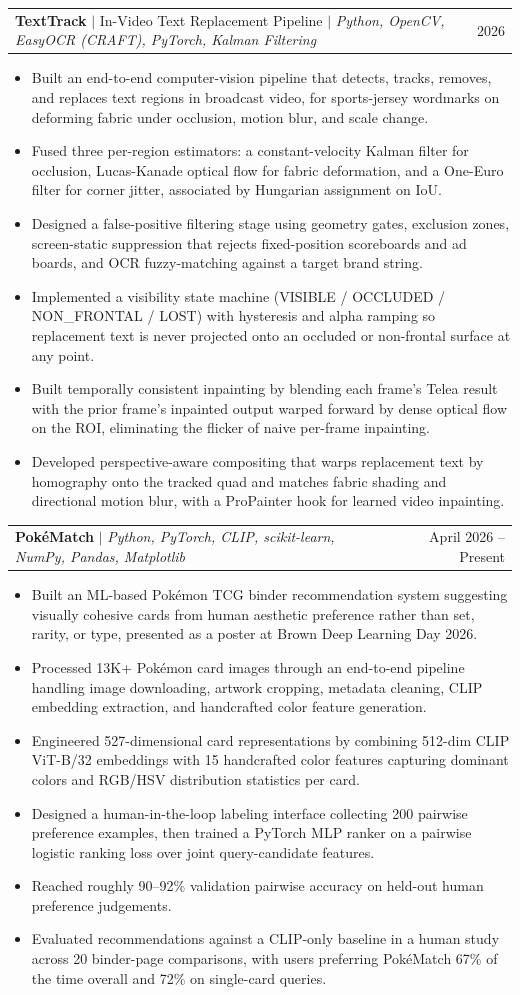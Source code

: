 \documentclass[letterpaper,11pt]{article}
\makeatletter
\newcommand{\resumeItem}[1]{
  \item\small{
    {#1 \vspace{-2pt}}
  }
}
\newcommand{\resumeProjectHeading}[2]{
    \item
    \begin{tabular*}{0.97\textwidth}{l@{\extracolsep{\fill}}r}
      \small#1 & #2 \\
    \end{tabular*}\vspace{-7pt}
}
\newcommand{\resumeItemListStart}{\begin{itemize}}
\newcommand{\resumeItemListEnd}{\end{itemize}\vspace{-5pt}}
\makeatother
\begin{document}
      \resumeProjectHeading
          {\textbf{TextTrack} $|$ In-Video Text Replacement Pipeline $|$ \emph{Python, OpenCV, EasyOCR (CRAFT), PyTorch, Kalman Filtering}}{2026}
          \resumeItemListStart
            \resumeItem{Built an end-to-end computer-vision pipeline that detects, tracks, removes, and replaces text regions in broadcast video, for sports-jersey wordmarks on deforming fabric under occlusion, motion blur, and scale change.}
            \resumeItem{Fused three per-region estimators: a constant-velocity Kalman filter for occlusion, Lucas-Kanade optical flow for fabric deformation, and a One-Euro filter for corner jitter, associated by Hungarian assignment on IoU.}
            \resumeItem{Designed a false-positive filtering stage using geometry gates, exclusion zones, screen-static suppression that rejects fixed-position scoreboards and ad boards, and OCR fuzzy-matching against a target brand string.}
            \resumeItem{Implemented a visibility state machine (VISIBLE / OCCLUDED / NON\_FRONTAL / LOST) with hysteresis and alpha ramping so replacement text is never projected onto an occluded or non-frontal surface at any point.}
            \resumeItem{Built temporally consistent inpainting by blending each frame's Telea result with the prior frame's inpainted output warped forward by dense optical flow on the ROI, eliminating the flicker of naive per-frame inpainting.}
            \resumeItem{Developed perspective-aware compositing that warps replacement text by homography onto the tracked quad and matches fabric shading and directional motion blur, with a ProPainter hook for learned video inpainting.}
          \resumeItemListEnd

      \resumeProjectHeading
          {\textbf{Pok\'eMatch} $|$ \emph{Python, PyTorch, CLIP, scikit-learn, NumPy, Pandas, Matplotlib}}{April 2026 -- Present}
          \resumeItemListStart
            \resumeItem{Built an ML-based Pok\'emon TCG binder recommendation system suggesting visually cohesive cards from human aesthetic preference rather than set, rarity, or type, presented as a poster at Brown Deep Learning Day 2026.}
            \resumeItem{Processed 13K+ Pok\'emon card images through an end-to-end pipeline handling image downloading, artwork cropping, metadata cleaning, CLIP embedding extraction, and handcrafted color feature generation.}
            \resumeItem{Engineered 527-dimensional card representations by combining 512-dim CLIP ViT-B/32 embeddings with 15 handcrafted color features capturing dominant colors and RGB/HSV distribution statistics per card.}
            \resumeItem{Designed a human-in-the-loop labeling interface collecting 200 pairwise preference examples, then trained a PyTorch MLP ranker on a pairwise logistic ranking loss over joint query-candidate features.}
            \resumeItem{Reached roughly 90--92\% validation pairwise accuracy on held-out human preference judgements.}
            \resumeItem{Evaluated recommendations against a CLIP-only baseline in a human study across 20 binder-page comparisons, with users preferring Pok\'eMatch 67\% of the time overall and 72\% on single-card queries.}
          \resumeItemListEnd
\end{document}
